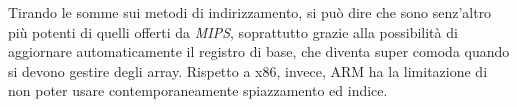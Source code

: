 \documentclass[class=book, crop=false, oneside]{standalone}
\begin{document}
Tirando le somme sui metodi di indirizzamento, si può dire che sono senz'altro più potenti di quelli offerti da \emph{MIPS}, soprattutto grazie alla possibilità di aggiornare automaticamente il registro di base, che diventa super comoda quando si devono gestire degli array. Rispetto a x86, invece, ARM ha la limitazione di non poter usare contemporaneamente spiazzamento ed indice.
\end{document}
